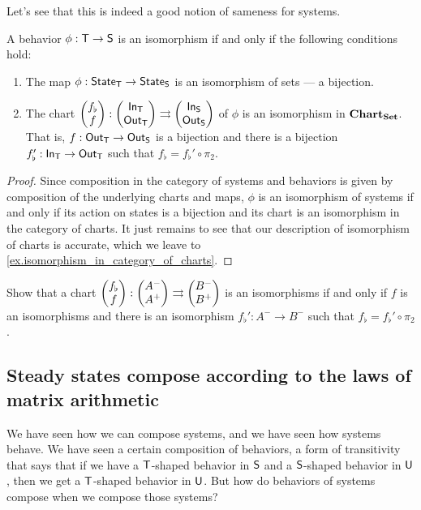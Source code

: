 \documentclass[DynamicalBook]{subfiles}
\begin{document}
{Let's see that this is indeed a good notion of sameness for systems.
\begin{proposition}\label{prop.isomorphism_of_systems_discrete}
  A behavior $\phi : \mathsf{T} \to \mathsf{S}$ is an isomorphism if and only if the
  following conditions hold:
\begin{enumerate}
  \item The map $\phi : \mathsf{State}_{\mathsf{T}} \to \mathsf{State}_{\mathsf{S}}$ is an isomorphism of sets --- a
    bijection.
  \item The chart $\begin{pmatrix}{f_{\flat}} \\ {f} \end{pmatrix} : \begin{pmatrix}{\mathsf{In}_{\mathsf{T}}} \\ {\mathsf{Out}_{\mathsf{T}}} \end{pmatrix}
    \rightrightarrows \begin{pmatrix}{\mathsf{In}_{\mathsf{S}}} \\ {\mathsf{Out}_{\mathsf{S}}} \end{pmatrix}$ of $\phi$ is an isomorphism in
    $\textbf{Chart}_{\textbf{Set}}$. That is, $f : \mathsf{Out}_{\mathsf{T}} \to \mathsf{Out}_{\mathsf{S}}$ is a bijection
    and there is a bijection $f_{\flat}' : \mathsf{In}_{\mathsf{T}} \to \mathsf{Out}_{\mathsf{T}}$ such that
    $f_{\flat} = f_{\flat}' \circ \pi_2$.
\end{enumerate}
\end{proposition}
\begin{proof}
  Since composition in the category of systems and behaviors is given by
  composition of the underlying charts and maps, $\phi$ is an isomorphism of
  systems if and only if its action on states is a bijection and its chart is an
  isomorphism in the category of charts. It just remains to see that our
  description of isomorphism of charts is accurate, which we leave to \cref{ex.isomorphism_in_category_of_charts}.
\end{proof}

\begin{exercise}\label{ex.isomorphism_in_category_of_charts}
  Show that a chart $\begin{pmatrix}{f_{\flat}} \\ {f} \end{pmatrix} : \begin{pmatrix}{A^-} \\ {A^+} \end{pmatrix}
    \rightrightarrows \begin{pmatrix}{B^-} \\ {B^+} \end{pmatrix}$ is an isomorphisms if and only if $f$ is
    an isomorphisms and there is an isomorphism $f_{\flat}' : A^- \to B^-$ such
    that $f_{\flat} = f_{\flat}' \circ \pi_2$. 
\end{exercise}

\subsection{Steady states compose according to the laws of matrix arithmetic}\label{sec.steady_states_matrix_arithmetic}


We have seen how we can compose systems, and we have seen how systems behave. We
have seen a certain composition of behaviors, a form of transitivity that says
that if we have a $\mathsf{T}$-shaped behavior in $\mathsf{S}$ and a $\mathsf{S}$-shaped
behavior in $\mathsf{U}$, then we get a $\mathsf{T}$-shaped behavior in $\mathsf{U}$. But
how do behaviors of systems compose when we compose those systems?

}
\end{document}
